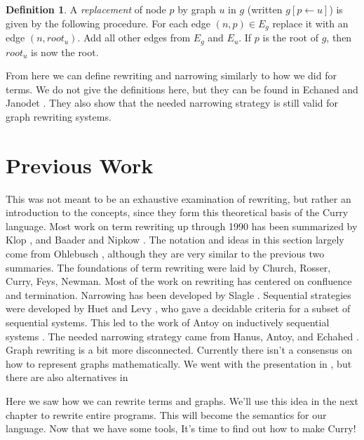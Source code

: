\documentclass{book}
\theoremstyle{definition}
\newtheorem{definition}{Definition}[section]
\begin{document}
\theoremstyle{definition}
\begin{definition}
A \textit{replacement} of node $p$ by graph $u$ in $g$ 
(written $g[p \leftarrow u]$) is given by the following procedure.
For each edge $(n,p) \in E_g$ replace it with an edge $(n, root_u)$.
Add all other edges from $E_g$ and $E_u$.
If $p$ is the root of $g$, then $root_u$ is now the root.
\end{definition}

From here we can define rewriting and narrowing similarly to how we did for terms.
We do not give the definitions here, but they can be found in Echaned and Janodet \cite{graphRewriting}.
They also show that the needed narrowing strategy is still valid for graph rewriting systems.

\section{Previous Work}
This was not meant to be an exhaustive examination of rewriting, but rather an introduction to the concepts,
since they form this theoretical basis of the Curry language.
Most work on term rewriting up through 1990 has been summarized by Klop \cite{termRewriting},
and Baader and Nipkow \cite{termAndAllThat}.
The notation and ideas in this section largely come from
Ohlebusch \cite{AdvancedTRS}, although they are very similar to the previous two summaries.
The foundations of term rewriting were laid by Church, Rosser, Curry, Feys, Newman. 
\cite{churchRosser, CombLogic, Newman}
Most of the work on rewriting has centered on confluence and termination. \cite{termRewriting}
Narrowing has been developed by Slagle \cite{narrowing}.
Sequential strategies were developed by Huet and Levy \cite{StrongSequential},
who gave a decidable criteria for a subset of sequential systems.
This led to the work of Antoy on inductively sequential systems \cite{DefinitionalTrees}.
The needed narrowing strategy came from Hanus, Antoy, and Echahed \cite{Needed}.
Graph rewriting is a bit more disconnected.  
Currently there isn't a consensus on how to represent graphs mathematically.
We went with the presentation in \cite{graphRewriting}, 
but there are also alternatives in \cite{termRewriting, termAndAllThat, AdvancedTRS}

Here we saw how we can rewrite terms and graphs.
We'll use this idea in the next chapter to rewrite entire programs.
This will become the semantics for our language.
Now that we have some tools, It's time to find out how to make Curry!
\end{document}
